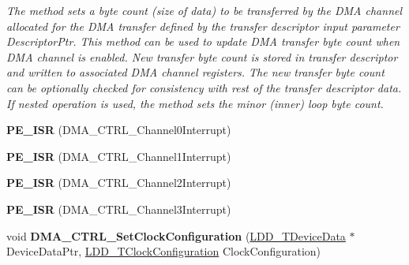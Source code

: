 \begin{DoxyCompactItemize}
\begin{DoxyCompactList}\small\item\em The method sets a byte count (size of data) to be transferred by the D\-M\-A channel allocated for the D\-M\-A transfer defined by the transfer descriptor input parameter Descriptor\-Ptr. This method can be used to update D\-M\-A transfer byte count when D\-M\-A channel is enabled. New transfer byte count is stored in transfer descriptor and written to associated D\-M\-A channel registers. The new transfer byte count can be optionally checked for consistency with rest of the transfer descriptor data. If nested operation is used, the method sets the minor (inner) loop byte count. \end{DoxyCompactList}\item 
\hypertarget{group___d_m_a___c_t_r_l__module_gae9670180792399f4c3459f12ff109fe6}{{\bfseries P\-E\-\_\-\-I\-S\-R} (D\-M\-A\-\_\-\-C\-T\-R\-L\-\_\-\-Channel0\-Interrupt)}\label{group___d_m_a___c_t_r_l__module_gae9670180792399f4c3459f12ff109fe6}

\item 
\hypertarget{group___d_m_a___c_t_r_l__module_ga0a9edeb2d22400354f6e8358b2150cf7}{{\bfseries P\-E\-\_\-\-I\-S\-R} (D\-M\-A\-\_\-\-C\-T\-R\-L\-\_\-\-Channel1\-Interrupt)}\label{group___d_m_a___c_t_r_l__module_ga0a9edeb2d22400354f6e8358b2150cf7}

\item 
\hypertarget{group___d_m_a___c_t_r_l__module_ga7d582271e716603e9f19d935e87af160}{{\bfseries P\-E\-\_\-\-I\-S\-R} (D\-M\-A\-\_\-\-C\-T\-R\-L\-\_\-\-Channel2\-Interrupt)}\label{group___d_m_a___c_t_r_l__module_ga7d582271e716603e9f19d935e87af160}

\item 
\hypertarget{group___d_m_a___c_t_r_l__module_gaeef016332b7d799da63538f65f860e04}{{\bfseries P\-E\-\_\-\-I\-S\-R} (D\-M\-A\-\_\-\-C\-T\-R\-L\-\_\-\-Channel3\-Interrupt)}\label{group___d_m_a___c_t_r_l__module_gaeef016332b7d799da63538f65f860e04}

\item 
\hypertarget{group___d_m_a___c_t_r_l__module_ga343baf6de050784880c4ffd12e3c8c20}{void {\bfseries D\-M\-A\-\_\-\-C\-T\-R\-L\-\_\-\-Set\-Clock\-Configuration} (\hyperlink{group___p_e___types__module_gac5cf1362f1f0e3a2ce71b1bf2276d091}{L\-D\-D\-\_\-\-T\-Device\-Data} $\ast$Device\-Data\-Ptr, \hyperlink{group___p_e___types__module_ga369bcaf7f00caad5f994c72ac2629a37}{L\-D\-D\-\_\-\-T\-Clock\-Configuration} Clock\-Configuration)}\label{group___d_m_a___c_t_r_l__module_ga343baf6de050784880c4ffd12e3c8c20}

\end{DoxyCompactItemize}
